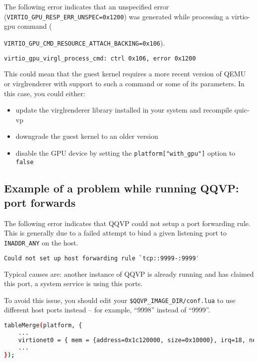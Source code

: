 The following error indicates that an unspecified error ({\small{\lstinline!VIRTIO_GPU_RESP_ERR_UNSPEC=0x1200!}})
was generated while processing a virtio-gpu command ({\mbox{{\small{\lstinline!VIRTIO_GPU_CMD_RESOURCE_ATTACH_BACKING=0x106!}}}).

\small
\begin{lstlisting}[language=bash]
    virtio_gpu_virgl_process_cmd: ctrl 0x106, error 0x1200
\end{lstlisting}
\normalsize

This could mean that the guest kernel requires a more recent version of QEMU or
virglrenderer with support to such a command or some of its parameters.
In this case, you could either:

\begin{itemize}
\item update the virglrenderer library installed in your system and recompile quic-vp
\item downgrade the guest kernel to an older version
\item disable the GPU device by setting the {\small{\lstinline!platform["with_gpu"]!}} option to {\small{\lstinline!false!}}
\end{itemize}

\clearpage
\subsection{Example of a problem while running QQVP: port forwards}

The following error indicates that QQVP could not setup a port forwarding
rule.  This is generally due to a failed attempt to bind a given listening port
to {\small{\lstinline!INADDR_ANY!}} on the host.

\small
\begin{lstlisting}[language=bash]
    Could not set up host forwarding rule `tcp::9999-:9999'
\end{lstlisting}
\normalsize

Typical causes are: another instance of QQVP is already running and has
claimed this port, a system service is using this ports.

To avoid this issue, you should edit your
{\small{\lstinline!$QQVP_IMAGE_DIR/conf.lua!}} to use different host ports
instead -- for example, ``9998'' instead of ``9999''.

\small
\begin{lstlisting}[language=bash]
tableMerge(platform, {
    ...
    virtionet0 = { mem = {address=0x1c120000, size=0x10000}, irq=18, netdev_str="type=user,hostfwd=tcp::2222-:22,hostfwd=tcp::2221-:21,hostfwd=tcp::9998-:1919"};
    ...
});
\end{lstlisting}
\normalsize

}
